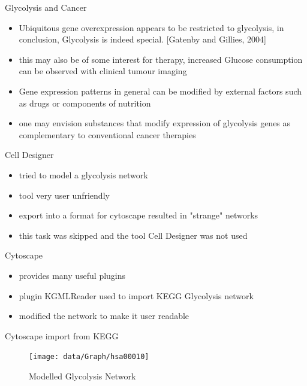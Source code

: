 \begin{frame}{Glycolysis and Cancer}
	\begin{itemize}
		\item Ubiquitous gene overexpression appears to be restricted to glycolysis, in conclusion, Glycolysis is indeed special. [Gatenby and Gillies, 2004]
		\item this may also be of some interest for therapy, increased Glucose consumption can be observed with clinical tumour imaging 
		\item Gene expression patterns in general can be modified by external factors such as drugs or components of nutrition
		\item one may envision substances that modify expression of glycolysis genes as complementary to conventional cancer therapies
	\end{itemize}
\end{frame}

\begin{frame}{Cell Designer}
	\begin{itemize}
		\item tried to model a glycolysis network
		\item tool very user unfriendly
		\item export into a format for cytoscape resulted in "strange" networks
		\item this task was skipped and the tool Cell Designer was not used
	\end{itemize}
\end{frame}

\begin{frame}{Cytoscape}
	\begin{itemize}
		\item provides many useful plugins 
		\item plugin KGMLReader used to import KEGG Glycolysis network
		\item modified the network to make it user readable
	\end{itemize}
\end{frame}

\begin{frame}{Cytoscape import from KEGG}
	\begin{figure}[htbp]
	   \centering
	   \texttt{[image: data/Graph/hsa00010]}
	   \caption{Modelled Glycolysis Network}
	   \label{fig:glycolysis}
	\end{figure}
\end{frame}

